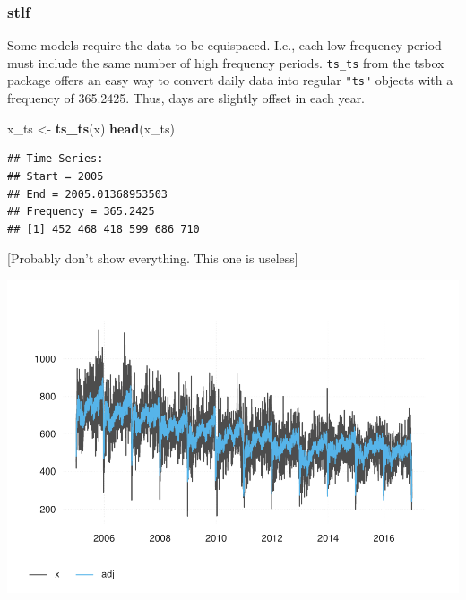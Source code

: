 \documentclass[
]{article}
\newenvironment{Shaded}{\begin{snugshade}}{\end{snugshade}}
\newcommand{\KeywordTok}[1]{\textcolor[rgb]{0.13,0.29,0.53}{\textbf{#1}}}
\newcommand{\NormalTok}[1]{#1}
\newcommand{\OperatorTok}[1]{\textcolor[rgb]{0.81,0.36,0.00}{\textbf{#1}}}
\newcommand{\StringTok}[1]{\textcolor[rgb]{0.31,0.60,0.02}{#1}}
\begin{document}
\hypertarget{stlf}{%
\subsubsection{stlf}\label{stlf}}

Some models require the data to be equispaced. I.e., each low frequency
period must include the same number of high frequency periods.
\texttt{ts\_ts} from the tsbox package offers an easy way to convert
daily data into regular \texttt{"ts"} objects with a frequency of
365.2425. Thus, days are slightly offset in each year.

\begin{Shaded}
\begin{Highlighting}[]
\NormalTok{x_ts <-}\StringTok{ }\KeywordTok{ts_ts}\NormalTok{(x)}
\KeywordTok{head}\NormalTok{(x_ts)}
\end{Highlighting}
\end{Shaded}

\begin{verbatim}
## Time Series:
## Start = 2005 
## End = 2005.01368953503 
## Frequency = 365.2425 
## [1] 452 468 418 599 686 710
\end{verbatim}

{[}Probably don't show everything. This one is useless{]}

\begin{Shaded}
\end{Shaded}

\includegraphics{overview_files/figure-latex/stlf-1.pdf}
\end{document}
